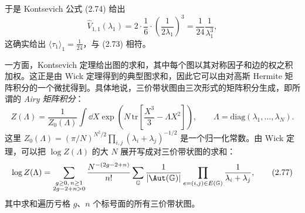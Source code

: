于是 Kontsevich 公式 (2.74) 给出
\begin{equation}
\widehat{V}_{1,1}(\lambda_1)=2\cdot\frac{1}{6}\cdot\left(\frac{1}{2\lambda_1}\right)^{3}=\frac{1}{24}\frac{1}{\lambda_1^3}, \tag{2.75}
\end{equation}
这确实给出 $\langle\tau_1\rangle_1=\frac{1}{24}$，与 (2.73) 相符。

一方面，Kontsevich 定理给出图的求和，其中每个图以其对称因子和边的权之积加权。这正是由 Wick 定理得到的典型图求和，因此它可以由对高斯 Hermite 矩阵积分的一个微扰得到。具体地说，三价带状图由三次形式的矩阵积分生成，即所谓的 \emph{Airy 矩阵积分}：
\begin{equation}
Z(\Lambda)=\frac{1}{Z_0(\Lambda)}\int \dd X\exp\left(N\,\mathrm{tr}\left[\frac{X^3}{3}-\Lambda X^2\right]\right),\qquad \Lambda=\mathrm{diag}(\lambda_1,\ldots,\lambda_N). \tag{2.76}
\end{equation}
这里 $Z_0(\Lambda)=(\pi/N)^{N^2/2}\prod_{i,j}(\lambda_i+\lambda_j)^{-1/2}$ 是一个归一化常数。由 Wick 定理，可以把 $\log Z(\Lambda)$ 的大 $N$ 展开写成对三价带状图的求和：
\begin{equation}
\log Z(\Lambda)=\sum_{\substack{g\ge0,\,n\ge1\\ 2g-2+n>0}}\frac{N^{-(2g-2+n)}}{n!}\sum_{\mathbb{G}}\frac{1}{|\Aut(\mathbb{G})|}\prod_{e=(i,j)\in E(\mathbb{G})}\frac{1}{\lambda_i+\lambda_j}, \tag{2.77}
\end{equation}
其中求和遍历亏格 $g$、$n$ 个标号面的所有三价带状图。


